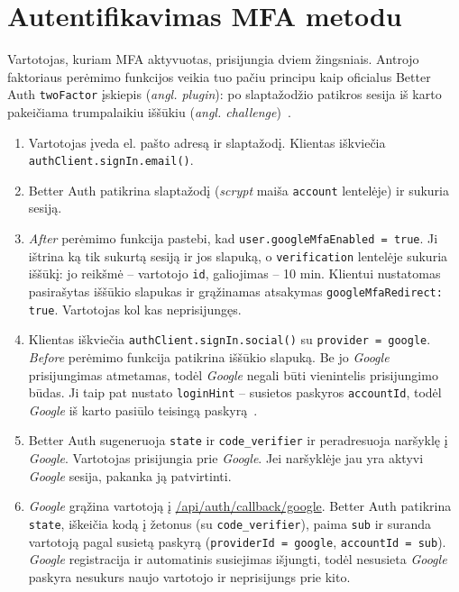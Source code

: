 \section{Autentifikavimas MFA metodu}
\label{sec:autentifikavimas}

Vartotojas, kuriam MFA aktyvuotas, prisijungia dviem žingsniais. Antrojo faktoriaus perėmimo funkcijos veikia tuo pačiu principu kaip oficialus Better Auth \texttt{twoFactor} įskiepis (\textit{angl. plugin}): po slaptažodžio patikros sesija iš karto pakeičiama trumpalaikiu iššūkiu (\textit{angl. challenge})~\cite{better_auth_2fa}.
\begin{enumerate}
    \item Vartotojas įveda el. pašto adresą ir slaptažodį. Klientas iškviečia \texttt{authClient.signIn.email()}.
    \item Better Auth patikrina slaptažodį (\textit{scrypt} maiša \texttt{account} lentelėje) ir sukuria sesiją.
    \item \textit{After} perėmimo funkcija pastebi, kad \texttt{user.googleMfaEnabled = true}. Ji ištrina ką tik sukurtą sesiją ir jos slapuką, o \texttt{verification} lentelėje sukuria iššūkį: jo reikšmė -- vartotojo \texttt{id}, galiojimas -- 10 min. Klientui nustatomas pasirašytas iššūkio slapukas ir grąžinamas atsakymas \texttt{googleMfaRedirect: true}. Vartotojas kol kas neprisijungęs.
    \item Klientas iškviečia \texttt{authClient.signIn.social()} su \texttt{provider = google}. \textit{Before} perėmimo funkcija patikrina iššūkio slapuką. Be jo \textit{Google} prisijungimas atmetamas, todėl \textit{Google} negali būti vienintelis prisijungimo būdas. Ji taip pat nustato \texttt{loginHint} -- susietos paskyros \texttt{accountId}, todėl \textit{Google} iš karto pasiūlo teisingą paskyrą~\cite{google_oidc}.
    \item Better Auth sugeneruoja \texttt{state} ir \texttt{code\_verifier} ir peradresuoja naršyklę į \textit{Google}. Vartotojas prisijungia prie \textit{Google}. Jei naršyklėje jau yra aktyvi \textit{Google} sesija, pakanka ją patvirtinti.
    \item \textit{Google} grąžina vartotoją į \url{/api/auth/callback/google}. Better Auth patikrina \texttt{state}, iškeičia kodą į žetonus (su \texttt{code\_verifier}), paima \texttt{sub} ir suranda vartotoją pagal susietą paskyrą (\texttt{providerId = google}, \texttt{accountId = sub}). \textit{Google} registracija ir automatinis susiejimas išjungti, todėl nesusieta \textit{Google} paskyra nesukurs naujo vartotojo ir neprisijungs prie kito.

\end{enumerate}

